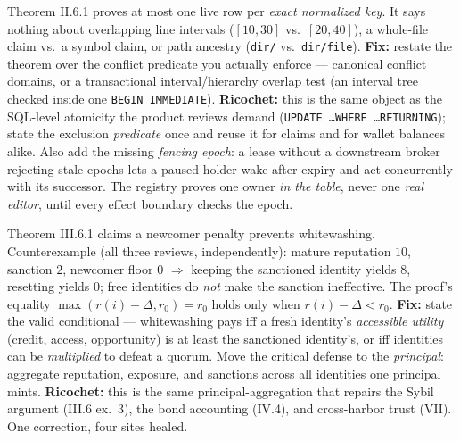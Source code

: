 \documentclass[11pt,a4paper]{article}
\begin{document}
\begin{change}
Theorem II.6.1 proves at most one live row per \emph{exact normalized key}. It says nothing about overlapping line intervals ($[10,30]$ vs.\ $[20,40]$), a whole-file claim vs.\ a symbol claim, or path ancestry (\texttt{dir/} vs.\ \texttt{dir/file}). \textbf{Fix:} restate the theorem over the conflict predicate you actually enforce --- canonical conflict domains, or a transactional interval/hierarchy overlap test (an interval tree checked inside one \texttt{BEGIN IMMEDIATE}). \textbf{Ricochet:} this is the same object as the SQL-level atomicity the product reviews demand (\texttt{UPDATE \ldots WHERE \ldots RETURNING}); state the exclusion \emph{predicate} once and reuse it for claims and for wallet balances alike. Also add the missing \emph{fencing epoch}: a lease without a downstream broker rejecting stale epochs lets a paused holder wake after expiry and act concurrently with its successor. The registry proves one owner \emph{in the table}, never one \emph{real editor}, until every effect boundary checks the epoch.
\end{change}

\begin{change}
Theorem III.6.1 claims a newcomer penalty prevents whitewashing. Counterexample (all three reviews, independently): mature reputation $10$, sanction $2$, newcomer floor $0$ $\Rightarrow$ keeping the sanctioned identity yields $8$, resetting yields $0$; free identities do \emph{not} make the sanction ineffective. The proof's equality $\max(r(i)-\Delta, r_0)=r_0$ holds only when $r(i)-\Delta < r_0$. \textbf{Fix:} state the valid conditional --- whitewashing pays iff a fresh identity's \emph{accessible utility} (credit, access, opportunity) is at least the sanctioned identity's, or iff identities can be \emph{multiplied} to defeat a quorum. Move the critical defense to the \emph{principal}: aggregate reputation, exposure, and sanctions across all identities one principal mints. \textbf{Ricochet:} this is the same principal-aggregation that repairs the Sybil argument (III.6 ex.\ 3), the bond accounting (IV.4), and cross-harbor trust (VII). One correction, four sites healed.
\end{change}
\end{document}
